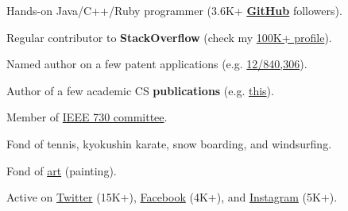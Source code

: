 \documentclass{./yb}
\begin{document}
Hands-on Java/C++/Ruby programmer
  (3.6K+ \textbf{\href{https://github.com/yegor256}{GitHub}} followers).

Regular contributor to \textbf{StackOverflow}
  (check my \href{https://stackexchange.com/users/63162/yegor256}{100K+ profile}).

Named author on a few patent applications
  (e.g. \href{https://www.google.com/patents/US20120023476}{12/840,306}).

Author of a few academic CS \textbf{publications}
  (e.g. \href{https://link.springer.com/chapter/10.1007/978-3-642-02152-7_6}{this}).

Member of \href{http://standards.ieee.org/develop/wg/730.html}{IEEE 730 committee}.

Fond of tennis, kyokushin karate, snow boarding, and windsurfing.

Fond of \href{https://www.yegor256.com/paintings.html}{art} (painting).

Active on
  \href{https://twitter.com/intent/follow?screen_name=yegor256}{Twitter} (15K+),
  \href{https://www.facebook.com/yegor256}{Facebook} (4K+),
  and \href{https://instagram.com/yegor256}{Instagram} (5K+).
\end{document}
